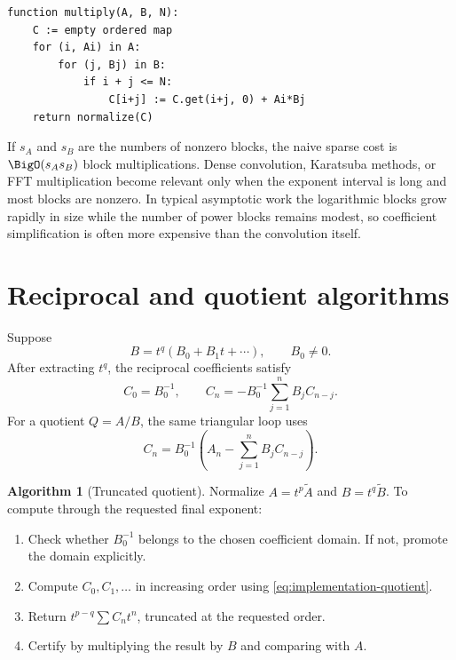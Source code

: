 \documentclass[11pt,openany]{book}
\theoremstyle{definition}
\newtheorem{algorithm}{Algorithm}[chapter]
\theoremstyle{plain}
\theoremstyle{remark}
\begin{document}
\begin{lstlisting}[style=pseudo,caption={Sparse block multiplication}]
function multiply(A, B, N):
    C := empty ordered map
    for (i, Ai) in A:
        for (j, Bj) in B:
            if i + j <= N:
                C[i+j] := C.get(i+j, 0) + Ai*Bj
    return normalize(C)
\end{lstlisting}

If \(s_A\) and \(s_B\) are the numbers of nonzero blocks, the naive sparse cost is \(\BigO(s_As_B)\) block multiplications. Dense convolution, Karatsuba methods, or FFT multiplication become relevant only when the exponent interval is long and most blocks are nonzero. In typical asymptotic work the logarithmic blocks grow rapidly in size while the number of power blocks remains modest, so coefficient simplification is often more expensive than the convolution itself.

\section{Reciprocal and quotient algorithms}
Suppose
\[
 B=t^q(B_0+B_1t+\cdots),\qquad B_0\ne0.
\]
After extracting \(t^q\), the reciprocal coefficients satisfy
\begin{equation}\label{eq:implementation-reciprocal}
 C_0=B_0^{-1},
 \qquad
 C_n=-B_0^{-1}\sum_{j=1}^{n}B_jC_{n-j}.
\end{equation}
For a quotient \(Q=A/B\), the same triangular loop uses
\begin{equation}\label{eq:implementation-quotient}
 C_n=B_0^{-1}\left(A_n-\sum_{j=1}^{n}B_jC_{n-j}\right).
\end{equation}

\begin{algorithm}[Truncated quotient]\label{alg:sparse-quotient}
Normalize \(A=t^p\widetilde A\) and \(B=t^q\widetilde B\). To compute through the requested final exponent:
\begin{enumerate}
\item Check whether \(B_0^{-1}\) belongs to the chosen coefficient domain. If not, promote the domain explicitly.
\item Compute \(C_0,C_1,\ldots\) in increasing order using \cref{eq:implementation-quotient}.
\item Return \(t^{p-q}\sum C_nt^n\), truncated at the requested order.
\item Certify by multiplying the result by \(B\) and comparing with \(A\).
\end{enumerate}
\end{algorithm}
\end{document}
